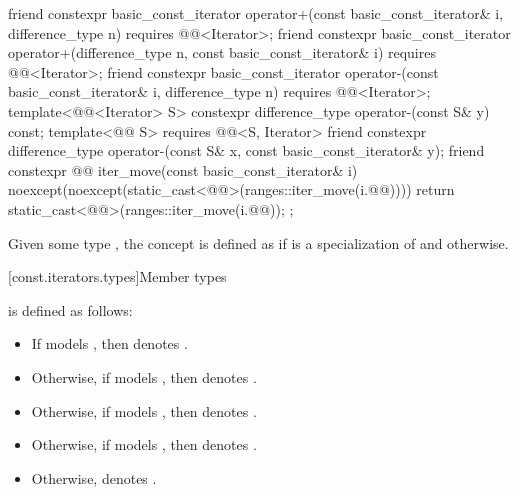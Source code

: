 \begin{codeblock}
{{    friend constexpr basic_const_iterator operator+(const basic_const_iterator& i,
                                                    difference_type n)
      requires @@<Iterator>;
    friend constexpr basic_const_iterator operator+(difference_type n,
                                                    const basic_const_iterator& i)
      requires @@<Iterator>;
    friend constexpr basic_const_iterator operator-(const basic_const_iterator& i,
                                                    difference_type n)
      requires @@<Iterator>;
    template<@@<Iterator> S>
      constexpr difference_type operator-(const S& y) const;
    template<@@ S>
      requires @@<S, Iterator>
      friend constexpr difference_type operator-(const S& x, const basic_const_iterator& y);
    friend constexpr @@ iter_move(const basic_const_iterator& i)
      noexcept(noexcept(static_cast<@@>(ranges::iter_move(i.@@))))
      {
        return static_cast<@@>(ranges::iter_move(i.@@));
      }
  };
}
\end{codeblock}

\pnum
Given some type ,
the concept  is defined as 
if  is a specialization of  and
 otherwise.

[const.iterators.types]{Member types}

\pnum
{} is defined as follows:
\begin{itemize}
\item
If  models ,
then  denotes .
\item
Otherwise, if  models ,
then  denotes .
\item
Otherwise, if  models ,
then  denotes .
\item
Otherwise, if  models ,
then  denotes .
\item
Otherwise,  denotes .
\end{itemize}

